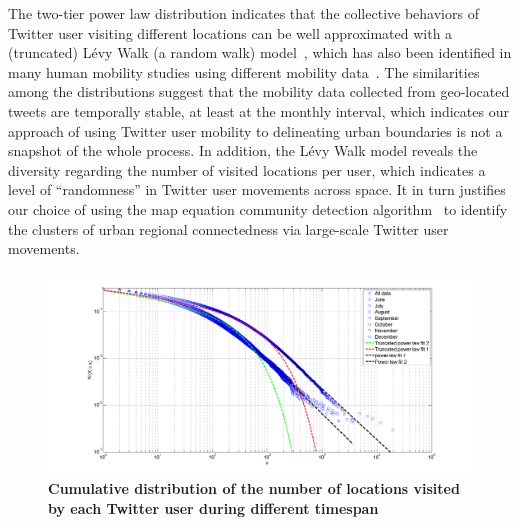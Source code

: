 \documentclass[10pt,letterpaper]{article}
\begin{document}
The two-tier power law distribution indicates that the collective behaviors of Twitter user visiting different locations can be well approximated with a (truncated) L\'{e}vy Walk (a random walk) model~\cite{rhee2011,reynolds2012}, which has also been identified in many human mobility studies using different mobility data~\cite{zhao2015}.
The similarities among the distributions suggest that the mobility data collected from geo-located tweets are temporally stable, at least at the monthly interval, which indicates our approach of using Twitter user mobility to delineating urban boundaries is not a snapshot of the whole process.  
In addition, the L\'{e}vy Walk model reveals the diversity regarding the number of visited locations per user, which indicates a level of ``randomness'' in Twitter user movements across space. 
It in turn justifies our choice of using the map equation community detection algorithm~\cite{rosvall2008} to identify the clusters of urban regional connectedness via large-scale Twitter user movements.

\begin{figure}[ht]
\includegraphics[width=1.0\linewidth]{./figure/PNG/S3_visitation}
\caption{{\bf Cumulative distribution of the number of locations visited by each Twitter user during different timespan}}
\label{S3_Fig}
\end{figure}
\end{document}
